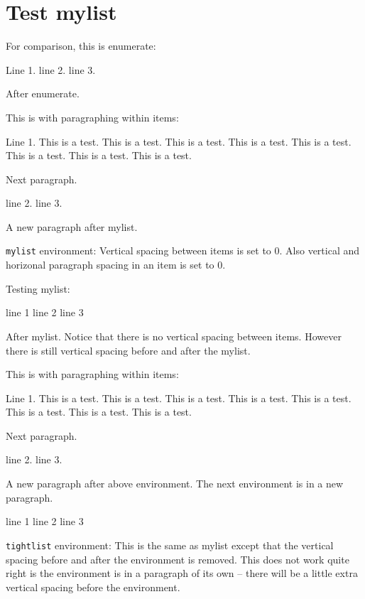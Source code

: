 \section{Test mylist}

For comparison, this is enumerate:
\begin{enumerate}
\li Line 1. 
\li line 2.
\li line 3.
\end{enumerate}
After enumerate.

This is with paragraphing within items:
\begin{enumerate}
\li Line 1. 
This is a test. This is a test. This is a test. This is a test. 
This is a test. This is a test. This is a test. This is a test. 

Next paragraph.
\lipsum[1]

\li line 2.
\li line 3.
\end{enumerate}

A new paragraph after mylist.






\newpage

\verb!mylist! environment:
Vertical spacing between items is set to 0.
Also vertical and horizonal paragraph spacing in an item is set to 0. 

Testing mylist:
\begin{mylist}
\li line 1
\li line 2
\li line 3
\end{mylist}
After mylist.
Notice that there is no vertical spacing between items.
However there is still vertical spacing before and after the mylist.

This is with paragraphing within items:
\begin{mylist}
\li Line 1. 
This is a test. This is a test. This is a test. This is a test. 
This is a test. This is a test. This is a test. This is a test. 

Next paragraph.
\lipsum[1]

\li line 2.
\li line 3.
\end{mylist}

A new paragraph after above environment.
The next environment is in a new paragraph.

\begin{mylist}
\li line 1
\li line 2
\li line 3
\end{mylist}




\newpage

\verb!tightlist! environment: 
This is the same as mylist except that the vertical spacing
before and after the environment is removed.
This does not work quite right is the environment is in a paragraph of its
own -- there will be a little extra vertical spacing before the environment.

